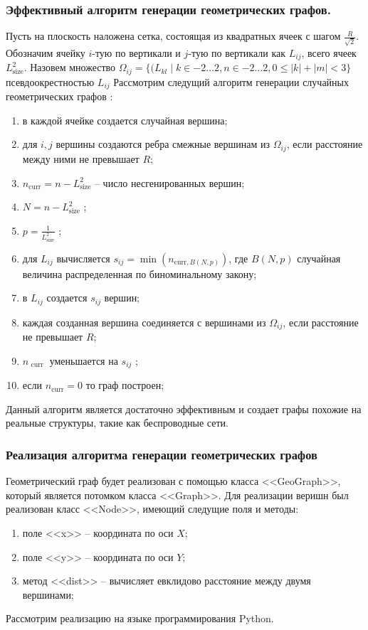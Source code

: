 \subsubsection{Эффективный алгоритм генерации геометрических графов.}

 Пусть на 
плоскость наложена сетка, состоящая из 
квадратных ячеек с шагом  $\frac{R}{\sqrt{2} }$. Обозначим 
ячейку  $i$-тую по вертикали и  $j$-тую по вертикали как $L_{ij}$,
всего ячеек $L_{\text{size}}^2$. Назовем множество 
$\Omega_{ij} = \{(L_{kl} \mid  k \in -2 \dots 2, n \in -2 \dots 2 , 
0 \le  |k| + |m| < 3\}$ псевдоокрестностью $L_{ij}$
Рассмотрим следущий алгоритм генерации случайных
геометрических графов \cite{geo} :
\begin{enumerate}
    \item в каждой ячейке создается случайная вершина;
    \item для $i,j$ вершины создаются ребра смежные
        вершинам из  $\Omega_{ij}$, если расстояние между ними не превышает $R$;
    \item  $n_{\text{curr}} = n - L^2_{\text{size}}$ -- число несгенированных вершин;
    \item $N = n - L^2_{\text{size}}$ ;
    \item $p = \frac{1}{L^2_{\text{size}}}$ ;
    \item для $L_{ij}$ вычисляется $s_{ij} = \min(n_{\text{curr},B(N,p)})$, где $B(N,p)$ случайная величина распределенная по 
        биноминальному закону;
    \item в $L_{ij}$ создается $s_{ij}$ вершин;
    \item каждая созданная вершина соединяется с вершинами из
        $\Omega_{ij}$, если расстояние не превышает $R$;
    \item  $n_{\text{ curr }}$ уменьшается на $s_{ij}$ ;
    \item если $n_{\text{curr}} = 0$ то граф построен;
\end{enumerate}
Данный алгоритм является достаточно эффективным и
создает графы похожие на реальные структуры, такие 
как беспроводные сети.
\subsubsection{Реализация алгоритма генерации геометрических графов}
Геометрический граф будет реализован с 
помощью класса <<GeoGraph>>, который 
является потомком класса <<Graph>>. Для
реализации веришн был реализован класс <<Node>>, имеющий следущие
поля и методы:
\begin{enumerate}
    \item поле <<x>> -- координата по оси  $X$;
    \item  поле  <<y>> -- координата по оси $Y$;
    \item метод  <<dist>> -- вычисляет евклидово расстояние между 
        двумя вершинами;
\end{enumerate}
Рассмотрим реализацию на языке программирования Python.

